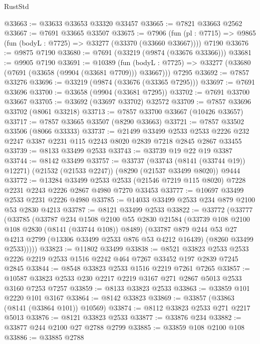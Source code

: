 \begin{lexlean}{RustStd}
\begin{coremodule}
@33663 := @33633 @33653 @33320 @33457
@33665 := @7821 @33663 @2562
@33667 := @7691 @33665 @33507
@33675 := @7906
    (fun (pl : @7715) => @9865 (fun (bodyL : @7725) => @33277 (@33370 (@33660 @33667))))
    @7190
@33676 := @9875 @7190
@33680 := @7691 (@33219 (@9874 (@33676 @33366)))
@33681 := @9905 @7190
@33691 := @10389
    (fun (bodyL : @7725) => @33277 (@33680 (@7691 (@33658 (@9904 (@33681 @7709))) @33667)))
    @7295
@33692 := @7857 @33276
@33696 := @33219 (@9874 (@33676 (@33365 @7295)))
@33697 := @7691 @33696
@33700 := @33658 (@9904 (@33681 @7295))
@33702 := @7691 @33700 @33667
@33705 := @33692 (@33697 @33702) @32572
@33709 := @7857 @33696 @33702 (@8061 @33218)
@33713 := @7857 @33700 @33667 (@10426 @33657)
@33717 := @7857 @33665 @33507 (@8290 @33663)
@33721 := @7857 @33502 @33506 (@8066 @33333)
@33737 := @21499
    @33499
    @2533
    @2533
    @2226
    @232
    @2247
    @3387
    @2231
    @115
    @2243
    @8020
    @2839
    @7218
    @2845
    @2867
    @33455
@33739 := @8133 @33499 @2533
@33743 := @33739 @19 @22 @19 @3387
@33744 := @8142 @33499
@33757 := @33737
    (@33743 (@8141 (@33744 @19)) @12271)
    (@21532 (@21533 @2247))
    (@8290 (@21537 @33499 @8020))
    @9444
@33772 := @13284
    @33499
    @2533
    @2533
    (@21546 @7219 @115 @8020)
    @7228
    @2231
    @2243
    @2226
    @2867
    @4980
    @7270
    @33453
@33777 := @10697 @33499 @2533 @2231 @2226 @4980
@33785 := @14033 @33499 @2533 @234 @879 @2100 @53 @2830 @4213
@33787 := @8121 @33499 @2533
@33822 := @33772
    (@33777
      (@33785
        (@33787
          @234
          @1508
          @2100
          @55
          @2830
          @21584
          (@33739 @108 @2100 @108 @2830 (@8141 (@33744 @108)) @8489)
          (@33787
            @879
            @244
            @53
            @27
            @4213
            @2799
            (@13306 @33499 @2533 @876 @53 @4212 @16439)
            (@8260 @33499 @2533)))))
@33823 := @11802 @33499
@33838 := @8521
    @33823
    @2533
    @2533
    @2226
    @2219
    @2533
    @1516
    @2242
    @464
    @7267
    @33452
    @197
    @2839
    @7245
    @2845
@33844 := @8548 @33823 @2533 @1516 @2219 @7261 @7265
@33857 := @10587 @33823 @2533 @230 @2217 @2219 @3167 @271 @2867 @5013 @2533 @3160 @7253 @7257
@33859 := @8133 @33823 @2533
@33863 := @33859 @101 @2220 @101 @3167
@33864 := @8142 @33823
@33869 := @33857 (@33863 (@8141 (@33864 @101)) @10569)
@33874 := @8112 @33823 @2533 @271 @2217 @5013
@33876 := @8121 @33823 @2533
@33877 := @33876 @234
@33882 := @33877 @244 @2100 @27 @2788 @2799
@33885 := @33859 @108 @2100 @108
@33886 := @33885 @2788

\end{coremodule}
\end{lexlean}
